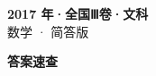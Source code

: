 \documentclass[zihao=-4, a4paper]{ctexart}
\begin{document}
\begin{center}
  {\Large\bfseries 2017 年·全国Ⅲ卷·文科}\\[4pt]
  {\large 数学 · 简答版}
\end{center}
\medskip
{}

\clearpage
{}
\begin{center}{\Large\bfseries 答案速查}\end{center}
\medskip

\end{document}
